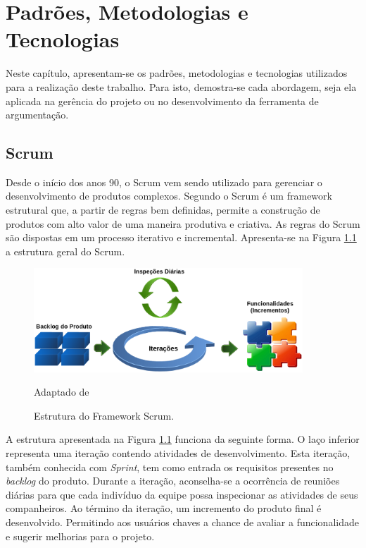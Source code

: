 \chapter{Padrões, Metodologias e Tecnologias}

Neste capítulo, apresentam-se os padrões, metodologias e tecnologias utilizados para a realização deste trabalho. Para isto, demostra-se cada abordagem, seja ela aplicada na gerência do projeto ou no desenvolvimento da ferramenta de argumentação.    

\section{Scrum}
\label{scrum_met}

Desde o início dos anos 90, o Scrum vem sendo utilizado para gerenciar o desenvolvimento de produtos complexos. Segundo \cite{guiascrum} o Scrum é um framework estrutural que, a partir de regras bem definidas, permite a construção de produtos com alto valor de uma maneira produtiva e criativa. As regras do Scrum são dispostas em um processo iterativo e incremental. Apresenta-se na Figura \ref{scrum-estrutura} a estrutura geral do Scrum.

\graphicspath{{figuras/}}
\begin{figure}[H]
\centering
\includegraphics[width=0.9\textwidth]{scrum-estrutura}
\caption{Estrutura do Framework Scrum.}{Adaptado de \cite{schwaber2004}} 
\label{scrum-estrutura}
\end{figure}

A estrutura apresentada na Figura \ref{scrum-estrutura} funciona da seguinte forma. O laço inferior representa uma iteração contendo atividades de desenvolvimento. Esta iteração, também conhecida com \textit{Sprint}, tem como entrada os requisitos presentes no \textit{backlog} do produto. Durante a iteração, aconselha-se a ocorrência de reuniões diárias para que cada indivíduo da equipe possa inspecionar as atividades de seus companheiros. Ao término da iteração, um incremento do produto final é desenvolvido. Permitindo aos usuários chaves a chance de avaliar a funcionalidade e sugerir melhorias para o projeto.

